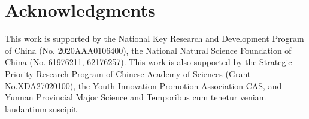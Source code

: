 \documentclass[]{article}
\begin{document}
\section*{Acknowledgments}
This work is supported by the National Key Research and Development Program of China (No. 2020AAA0106400), the National Natural Science Foundation of China (No. 61976211, 62176257). This work is also supported by the Strategic Priority Research Program of Chinese Academy of Sciences (Grant No.XDA27020100), the Youth Innovation Promotion Association CAS, and Yunnan Provincial Major Science and  Temporibus cum tenetur veniam laudantium suscipit

\end{document}
